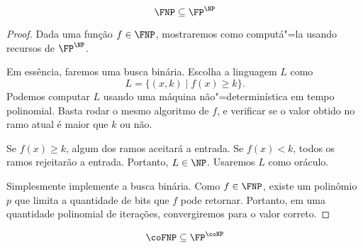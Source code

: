 \begin{theorem}
    \begin{equation*}
        \FNP \subseteq \FP^\NP
    \end{equation*}
\end{theorem}
\begin{proof}
    Dada uma função $f \in \FNP$,
    mostraremos como computá"=la usando recursos de $\FP^\NP$.

    Em essência, faremos uma busca binária.
    Escolha a linguagem $L$ como
    \begin{equation*}
        L = \{ (x, k) \mid f(x) \geq k \}.
    \end{equation*}
    Podemos computar $L$ usando uma máquina não"=determinística em tempo polinomial.
    Basta rodar o mesmo algoritmo de $f$,
    e verificar se o valor obtido no ramo atual
    é maior que $k$ ou não.

    Se $f(x) \geq k$,
    algum dos ramos aceitará a entrada.
    Se $f(x) < k$,
    todos os ramos rejeitarão a entrada.
    Portanto, $L \in \NP$.
    Usaremos $L$ como oráculo.

    Simplesmente implemente a busca binária.
    Como $f \in \FNP$,
    existe um polinômio $p$ que limita a quantidade de bits que $f$ pode retornar.
    Portanto,
    em uma quantidade polinomial de iterações,
    convergiremos para o valor correto.
\end{proof}

\begin{ucorollary}
    \begin{equation*}
        \coFNP \subseteq \FP^\coNP
    \end{equation*}
\end{ucorollary}
